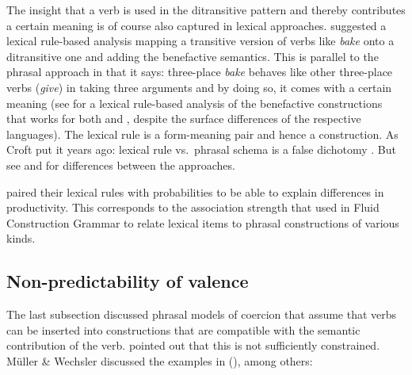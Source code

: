 \documentclass[output=paper,biblatex,babelshorthands,newtxmath,draftmode,colorlinks,citecolor=brown]{langscibook}
\begin{document}
The insight that a verb is used in the ditransitive pattern and thereby contributes a certain
meaning is of course also captured in lexical approaches. \citet[Section~5]{BC99a} suggested a lexical
rule-based analysis mapping a transitive version of verbs like \emph{bake} onto a ditransitive one
and adding the benefactive semantics. This is parallel to the phrasal approach in that it says:
three-place \emph{bake} behaves like other three-place verbs (\eg \emph{give}) in taking three
arguments and by doing so, it comes with a certain meaning (see \citealt{MuellerLFGphrasal} for a
lexical rule-based analysis of the benefactive constructions that works for both  and ,
despite the surface differences of the respective languages). The lexical rule is a form-meaning pair
and hence a construction.
\setcounter{croftyears}{\year-2003}
As Croft put it \thecroftyears{} years ago: lexical rule vs.\ phrasal schema is a false
dichotomy \citep{Croft2003a}. But see  and  for
differences between the approaches.

\citet{BC99a} paired their lexical rules with probabilities to be able to explain differences in
productivity. This corresponds to the association strength that \citet[]{vanTrijp2011a}
used in Fluid Construction Grammar to relate lexical items to phrasal constructions of various kinds.

\subsection{Non-predictability of valence}

\largerpage
The last subsection discussed phrasal models of coercion that assume that verbs can be inserted
into constructions that are compatible with the semantic contribution of the verb. \citet[Section~7.4]{MWArgSt}
pointed out that this is not sufficiently constrained. Müller \& Wechsler discussed the examples in
(), among others:
\end{document}
